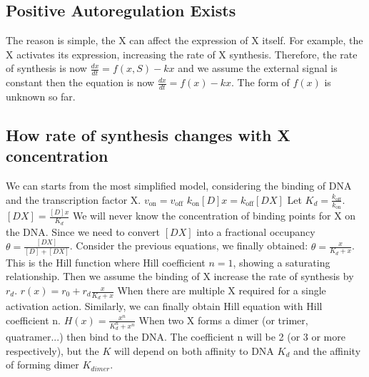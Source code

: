 \documentclass[UTF8,12pt,a4paper,fontset=fandol]{ctexart}
\begin{document}
\subsection{Positive Autoregulation Exists}
The reason is simple, the X can affect the expression of X itself.
\newline For example, the X activates its expression, increasing the rate of X synthesis.
\newline Therefore, the rate of synthesis is now
\newline $\frac{dx}{dt} = f(x,S) - kx$
\newline and we assume the external signal is constant then the equation is now
\newline $\frac{dx}{dt} = f(x) - kx$.
\newline The form of $f(x)$ is unknown so far.

\subsection{How rate of synthesis changes with X concentration}
We can starts from the most simplified model, considering the binding of DNA and the transcription factor X.
\newline {}
\newline $v_{\text{on}}=v_{\text{off}}$
\newline $k_{\text{on}}[D]x=k_{\text{off}}[DX]$
\newline Let $K_d = \frac{k_{\text{off}}}{k_{\text{on}}}$.
\newline $[DX] = \frac{[D]x}{K_d}$
\newline We will never know the concentration of binding points for X on the DNA. Since we need to convert $[DX]$ into a fractional occupancy $\theta = \frac{[DX]}{[D]+ [DX]}$.
\newline Consider the previous equations, we finally obtained: $\theta = \frac{x}{K_d+x}$.
\newline This is the Hill function where Hill coefficient $n=1$, showing a saturating relationship.
\newline Then we assume the binding of X increase the rate of synthesis by $r_d$.
\newline $r(x) = r_0 +  r_d \frac{x}{K_d + x}$
\newline When there are multiple X required for a single activation action. Similarly, we can finally obtain Hill equation with Hill coefficient n.
\newline $H(x) = \frac{x^n}{K_d^n+x^n}$
\newline When two X forms a dimer (or trimer, quatramer...) then bind to the DNA. The coefficient n will be 2 (or 3 or more respectively), but the $K$ will depend on both affinity to DNA $K_d$ and the affinity of forming dimer $K_{dimer}$.
\end{document}
